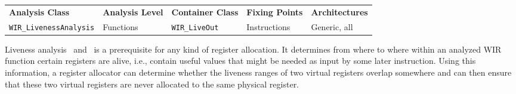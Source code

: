 \begin{tabular}{|l|l|l|l|l|}
  \hline
  \textbf{Analysis Class} & \textbf{Analysis Level} & \textbf{Container Class} & \textbf{Fixing Points} & \textbf{Architectures} \\
  \hhline{|=|=|=|=|=|}
  \texttt{\small WIR\_LivenessAnalysis} & Functions & \texttt{\small WIR\_LiveOut} & Instructions & Generic, all \\
  \hline
\end{tabular}

Liveness analysis~\cite[chapter~10]{Appel04} and~\cite[chapter~14.1.3]{Much97} is a prerequisite for any kind of register allocation.
It determines from where to where within an analyzed \gls{WIR} function certain registers are alive, i.e., contain useful values that might be needed as input by some later instruction.
Using this information, a register allocator can determine whether the liveness ranges of two virtual registers overlap somewhere and can then ensure that these two virtual registers are never allocated to the same physical register.

